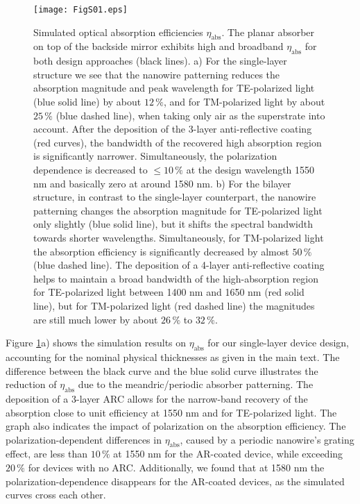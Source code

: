 \documentclass[aip,apl,showpacs,showkeys,preprint,superscriptaddress,preprintnumbers,amsmath,amssymb]{revtex4-1}
\begin{document}
\begin{bibunit}
\begin{figure}
\texttt{[image: FigS01.eps]}
\caption{\label{fig:s01} Simulated optical absorption efficiencies $\eta_\mathrm{abs}$. The planar absorber on top of the backside mirror exhibits high and broadband $\eta_\mathrm{abs}$ for both design approaches (black lines). a) For the single-layer structure we see that the nanowire patterning reduces the absorption magnitude and peak wavelength for TE-polarized light (blue solid line) by about $12\,\%$, and for TM-polarized light by about $25\,\%$ (blue dashed line), when taking only air as the superstrate into account. After the deposition of the 3-layer anti-reflective coating (red curves), the bandwidth of the recovered high absorption region is significantly narrower. Simultaneously, the polarization dependence is decreased to $\le10\,\%$ at the design wavelength 1550 nm and basically zero at around 1580 nm. b) For the bilayer structure, in contrast to the single-layer counterpart, the nanowire patterning changes the absorption magnitude for TE-polarized light only slightly (blue solid line), but it shifts the spectral bandwidth towards shorter wavelengths. Simultaneously, for TM-polarized light the absorption efficiency is significantly decreased by almost $50\,\%$ (blue dashed line). The deposition of a 4-layer anti-reflective coating helps to maintain a broad bandwidth of the high-absorption region for TE-polarized light between 1400 nm and 1650 nm (red solid line), but for TM-polarized light (red dashed line) the magnitudes are still much lower by about $26\,\%$ to $32\,\%$.}
\end{figure}

Figure \ref{fig:s01}a) shows the simulation results on $\eta_\mathrm{abs}$ for our single-layer device design, accounting for the nominal physical thicknesses as given in the main text. The 
difference between the black curve and the blue solid curve illustrates the reduction of $\eta_\mathrm{abs}$ due to the meandric/periodic absorber patterning. The deposition of a 3-layer ARC allows for the narrow-band recovery of the absorption close to unit efficiency at 1550 nm and for TE-polarized light. The graph also indicates the impact of polarization on the absorption efficiency. The polarization-dependent differences in $\eta_\mathrm{abs}$, caused by a periodic nanowire's grating effect, are less than $10\,\%$ at 1550 nm for the AR-coated device, while exceeding $20\,\%$ for devices with no ARC. Additionally, we found that at 1580 nm the polarization-dependence disappears for the AR-coated devices, as the simulated curves cross each other.


\end{bibunit}
\end{document}

